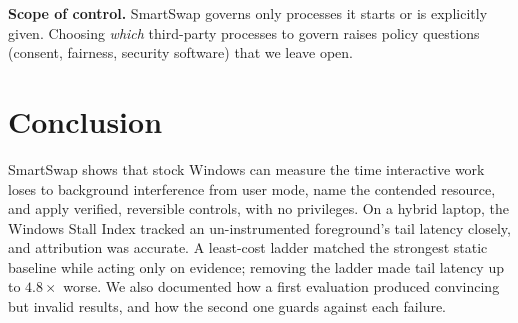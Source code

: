 \textbf{Scope of control.} SmartSwap governs only processes it starts or is explicitly given. Choosing \emph{which} third-party processes to govern raises policy questions (consent, fairness, security software) that we leave open.

\section{Conclusion}
SmartSwap shows that stock Windows can measure the time interactive work loses to background interference from user mode, name the contended resource, and apply verified, reversible controls, with no privileges. On a hybrid laptop, the Windows Stall Index tracked an un-instrumented foreground's tail latency closely, and attribution was accurate. A least-cost ladder matched the strongest static baseline while acting only on evidence; removing the ladder made tail latency up to $4.8\times$ worse. We also documented how a first evaluation produced convincing but invalid results, and how the second one guards against each failure.
